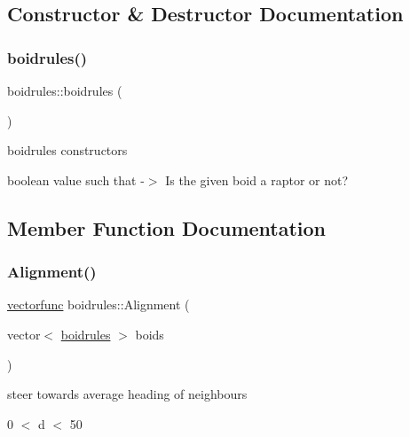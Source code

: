 \subsection{Constructor \& Destructor Documentation}
\mbox{\label{classboidrules_a0fa44ded12febb8a903073fad1205e5b}} 
\subsubsection{\texorpdfstring{boidrules()}{boidrules()}}
{\footnotesize\ttfamily boidrules\+::boidrules (\begin{DoxyParamCaption}{ }\end{DoxyParamCaption})\hspace{0.3cm}{\ttfamily [inline]}}



boidrules constructors 

boolean value such that -\/$>$ Is the given boid a raptor or not? 

\subsection{Member Function Documentation}
\mbox{\label{classboidrules_a923af948aad8d8679eddfcc461760e6e}} 
\subsubsection{\texorpdfstring{Alignment()}{Alignment()}}
{\footnotesize\ttfamily \mbox{\hyperlink{classvectorfunc}{vectorfunc}} boidrules\+::\+Alignment (\begin{DoxyParamCaption}\item[{vector$<$ \mbox{\hyperlink{classboidrules}{boidrules}} $>$}]{boids }\end{DoxyParamCaption})}



steer towards average heading of neighbours 

0 $<$ d $<$ 50 \mbox{\label{classboidrules_a8c50a648361809de6a75a94c76f0bea9}} 
